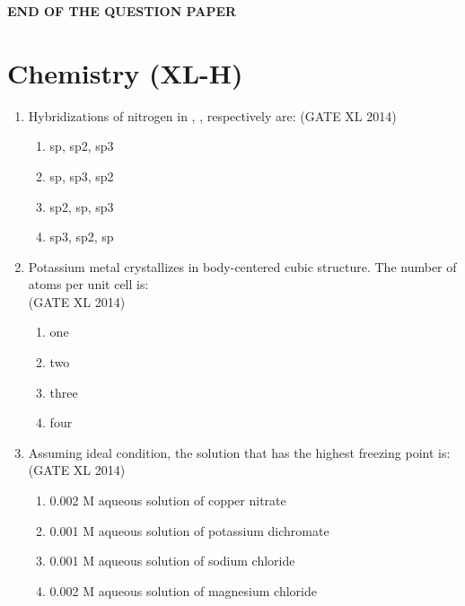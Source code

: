 \documentclass[journal,12pt,onecolumn]{IEEEtran}
\theoremstyle{remark}
\begin{document}
\begin{center}
    \textbf{END OF THE QUESTION PAPER}
\end{center}
\clearpage

\section*{\textbf{Chemistry (XL-H)}}

\begin{enumerate}
  \item Hybridizations of nitrogen in , ,  respectively are:
  \hfill (GATE XL 2014)\\
  \begin{multicols}{2}
  \begin{enumerate}
    \item sp, sp2, sp3
    \item sp, sp3, sp2
    \item sp2, sp, sp3
    \item sp3, sp2, sp
  \end{enumerate}
  \end{multicols}

  \item Potassium metal crystallizes in body-centered cubic structure. The number of atoms per unit cell is: \\
  \hfill (GATE XL 2014)\\
  \begin{multicols}{2}
  \begin{enumerate}
    \item one
    \item two
    \item three
    \item four
  \end{enumerate}
  \end{multicols}

  \item Assuming ideal condition, the solution that has the highest freezing point is: \\
  \hfill (GATE XL 2014)\\
  \begin{multicols}{2}
  \begin{enumerate}
    \item 0.002 M aqueous solution of copper nitrate
    \item 0.001 M aqueous solution of potassium dichromate
    \item 0.001 M aqueous solution of sodium chloride
    \item 0.002 M aqueous solution of magnesium chloride
  \end{enumerate}
  \end{multicols}


\end{enumerate}
\end{document}
